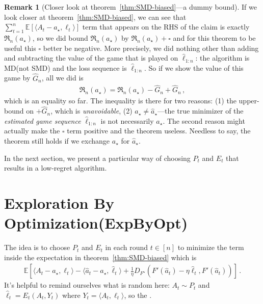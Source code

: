 \documentclass{article}
\theoremstyle{plain}
\theoremstyle{definition}
\newtheorem{remark}[theorem]{Remark}
\newcommand{\Reg}{\mathfrak{R}}
\newcommand{\E}{\mathbb E}
\newcommand{\mdalg}{\textsf{MD}\xspace}
\newcommand{\smdalg}{\textsf{SMD}\xspace}
\newcommand{\expbyopt}{\textsf{ExpByOpt}\xspace}
\newcommand{\hl}{\hat{\ell}\xspace}
\begin{document}
\begin{remark}[Closer look at theorem~\ref{thm:SMD-biased}---a dummy bound]
    \label{rem:dummy-bound}
    If we look closer at theorem~\ref{thm:SMD-biased}, we can see that
    $\sum_{t=1}^{n} \E[\langle A_t - a_\star, \ell_t\rangle]$ term
    that appears on the RHS of the claim is exactly $\Reg_n(a_\star)$,
    so we did bound $\Reg_n(a_\star)$ by $\Reg_n(a_\star) + \square$ and
    for this theorem to be useful this $\square$ better be negative.
    More precisely, we did nothing other than adding and subtracting the value of the game
    that is played on $\hl_{1:n}$: the algorithm is \mdalg (not {\smdalg})
    and the loss sequence is $\hl_{1:n}$.
    So if we show the value of this game by $\hat{G}_n$, all we did is
    \begin{align*}
        \Reg_n(a_\star) = \Reg_n(a_\star) - \hat{G}_n + \hat{G}_n \,,
    \end{align*}
    which is an equality so far.
    The inequality is there for two reasons: (1) the upper-bound on
    $+ \hat{G}_n$, which is \textit{unavoidable},
    (2) $a_\star \neq \hat{a}_\star$---the true minimizer of the
    \textit{estimated game sequence} $\hl_{1:n}$ is not necessarily
    $a_\star$.
    The second reason might actually make the $\square$ term positive
    and the theorem useless.
    Needless to say, the theorem still holds if we exchange $a_\star$
    for $\hat{a}_\star$.
\end{remark}

In the next section, we present a particular way of choosing $P_t$ and $E_t$
that results in a low-regret algorithm.

\section{Exploration By Optimization(\expbyopt)}
The idea is to choose $P_t$ and $E_t$ in each round $t \in [n]$
to minimize the term inside the expectation in theorem~\ref{thm:SMD-biased}
which is
\begin{align*}
    \E\left[
        \langle A_t - a_\star, \ell_t\rangle
        - \langle \hat{a}_t - a_\star, \hl_t\rangle
        + \frac{1}{\eta} D_{F^\star}(F'(\hat{a}_t) - \eta \hl_t, F'(\hat{a}_t))
        \right]\,.
\end{align*}
It's helpful to remind ourselves what is random here: $A_t \sim P_t$ and
$\hl_t = E_t(A_t, Y_t)$ where $Y_t = \langle A_t, \ell_t \rangle$,
so the .
\end{document}
